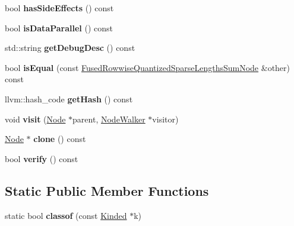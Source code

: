 \begin{DoxyCompactItemize}
bool {\bfseries has\+Side\+Effects} () const
\item 
\mbox{\label{classglow_1_1_fused_rowwise_quantized_sparse_lengths_sum_node_ad7f5fa94493598246952d4984506d3dd}} 
bool {\bfseries is\+Data\+Parallel} () const
\item 
\mbox{\label{classglow_1_1_fused_rowwise_quantized_sparse_lengths_sum_node_a4768fc7b5d6eda504082689594648971}} 
std\+::string {\bfseries get\+Debug\+Desc} () const
\item 
\mbox{\label{classglow_1_1_fused_rowwise_quantized_sparse_lengths_sum_node_ab495434407fd14c160a062f28f447d1e}} 
bool {\bfseries is\+Equal} (const \hyperlink{classglow_1_1_fused_rowwise_quantized_sparse_lengths_sum_node}{Fused\+Rowwise\+Quantized\+Sparse\+Lengths\+Sum\+Node} \&other) const
\item 
\mbox{\label{classglow_1_1_fused_rowwise_quantized_sparse_lengths_sum_node_a129304e040bf669cff2f545cea8794f5}} 
llvm\+::hash\+\_\+code {\bfseries get\+Hash} () const
\item 
\mbox{\label{classglow_1_1_fused_rowwise_quantized_sparse_lengths_sum_node_a96460827418462cdd50a3a8c8ec7def5}} 
void {\bfseries visit} (\hyperlink{classglow_1_1_node}{Node} $\ast$parent, \hyperlink{classglow_1_1_node_walker}{Node\+Walker} $\ast$visitor)
\item 
\mbox{\label{classglow_1_1_fused_rowwise_quantized_sparse_lengths_sum_node_a7754af0a66ee4b270d2324e213f1b53d}} 
\hyperlink{classglow_1_1_node}{Node} $\ast$ {\bfseries clone} () const
\item 
\mbox{\label{classglow_1_1_fused_rowwise_quantized_sparse_lengths_sum_node_aa18c903a7f9894c7b1a5f6ae0f17adf2}} 
bool {\bfseries verify} () const
\end{DoxyCompactItemize}
\subsection*{Static Public Member Functions}
\begin{DoxyCompactItemize}
\item 
\mbox{\label{classglow_1_1_fused_rowwise_quantized_sparse_lengths_sum_node_af8ec64cbb077e5263d09c814323d83ea}} 
static bool {\bfseries classof} (const \hyperlink{classglow_1_1_kinded}{Kinded} $\ast$k)
\end{DoxyCompactItemize}

